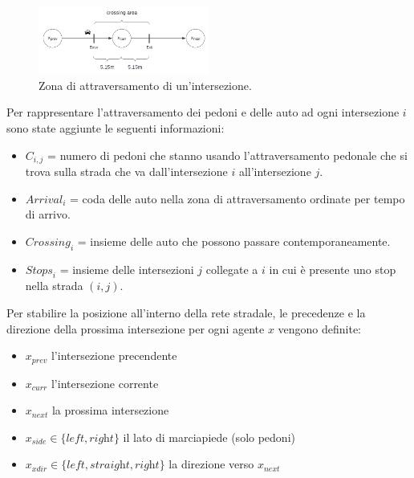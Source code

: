 \begin{figure}[ht]
    \centering
    \includegraphics[width=0.5\textwidth]{images/crossing_area}
    \caption{Zona di attraversamento di un'intersezione.}
    \label{fig:crossing-area}
\end{figure}

\newpage

Per rappresentare l'attraversamento dei pedoni e delle auto ad ogni intersezione $i$ sono state aggiunte le seguenti informazioni:
\begin{itemize}
    \item $C_{i, j}$ = numero di pedoni che stanno usando l'attraversamento pedonale che si trova sulla strada che va dall'intersezione $i$ all'intersezione $j$.
    \item $\textit{Arrival}_i$ = coda delle auto nella zona di attraversamento ordinate per tempo di arrivo.
    \item $\textit{Crossing}_i$ = insieme delle auto che possono passare contemporaneamente.
    \item $\textit{Stops}_i$ = insieme delle intersezioni $j$ collegate a $i$ in cui è presente uno stop nella strada $(i, j)$.
\end{itemize}


Per stabilire la posizione all'interno della rete stradale, le precedenze e la direzione della prossima intersezione per ogni agente $x$
vengono definite:
\begin{itemize}
    \item $x_{prev}$ l'intersezione precendente
    \item $x_{curr}$ l'intersezione corrente
    \item $x_{next}$ la prossima intersezione
    \item $x_{side} \in \{ \textit{left}, \textit{right} \}$  il lato di marciapiede (solo pedoni)
    \item $x_{xdir} \in \{\textit{left}, \textit{straight}, \textit{right}\}$ la direzione verso $x_{next}$
\end{itemize}

